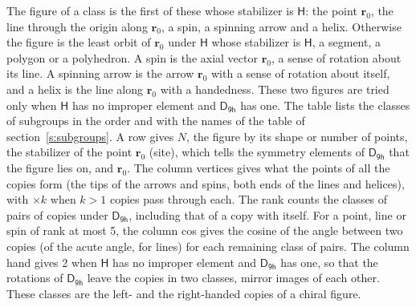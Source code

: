 \documentclass[10pt,a4paper]{article}
\numberwithin{equation}{section}
\newcommand{\grp}[1]{\mathsf{#1}}
\newcommand{\pointr}{\mathbf{r}}
\begin{document}
\leavevmode\label{n:head.figure}The figure of a class is the first of these whose stabilizer is $\grp{H}$: the point $\pointr_0$, the line through the origin along $\pointr_0$, a spin, a spinning arrow and a helix. Otherwise the figure is the least orbit of $\pointr_0$ under $\grp{H}$ whose stabilizer is $\grp{H}$, a segment, a polygon or a polyhedron. A spin is the axial vector $\pointr_0$, a sense of rotation about its line. A spinning arrow is the arrow $\pointr_0$ with a sense of rotation about itself, and a helix is the line along $\pointr_0$ with a handedness. These two figures are tried only when $\grp{H}$ has no improper element and $\grp{D_{9h}}$ has one. The table lists the classes of subgroups in the order and with the names of the table of section~\ref{s:subgroups}. \label{n:head.site}A row gives $N$, the figure by its shape or number of points, the stabilizer of the point $\pointr_0$ (site), which tells the symmetry elements of $\grp{D_{9h}}$ that the figure lies on, and $\pointr_0$. \label{n:head.vertices}The column vertices gives what the points of all the copies form (the tips of the arrows and spins, both ends of the lines and helices), with ${\times}k$ when $k > 1$ copies pass through each. \label{n:head.rank}The rank counts the classes of pairs of copies under $\grp{D_{9h}}$, including that of a copy with itself. \label{n:head.cos}For a point, line or spin of rank at most 5, the column cos gives the cosine of the angle between two copies (of the acute angle, for lines) for each remaining class of pairs. \label{n:head.hand}The column hand gives 2 when $\grp{H}$ has no improper element and $\grp{D_{9h}}$ has one, so that the rotations of $\grp{D_{9h}}$ leave the copies in two classes, mirror images of each other. These classes are the left- and the right-handed copies of a chiral figure.
\end{document}

